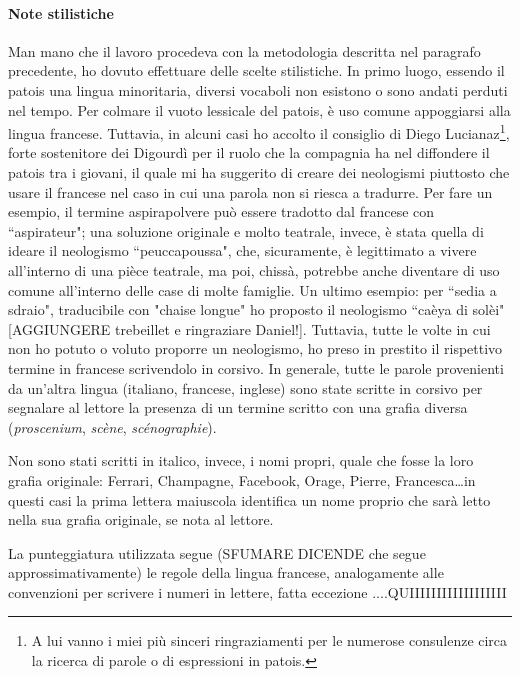 \paragraph*{Note stilistiche}
Man mano che il lavoro procedeva con la metodologia descritta nel paragrafo precedente, ho dovuto effettuare delle scelte stilistiche.
In primo luogo, essendo il patois una lingua minoritaria, diversi vocaboli non esistono o  sono andati perduti nel tempo. Per colmare il vuoto lessicale del patois, è uso comune appoggiarsi alla lingua francese. Tuttavia, in alcuni casi ho accolto il consiglio di Diego Lucianaz\footnote{ A lui vanno i miei più sinceri ringraziamenti per le numerose consulenze circa la ricerca di parole o di espressioni in patois.}, forte sostenitore dei Digourdì per il ruolo che la compagnia ha nel diffondere il patois tra i giovani, il quale mi ha suggerito di creare dei neologismi piuttosto che usare il francese nel caso in cui una parola non si riesca a tradurre. Per fare un esempio, il termine aspirapolvere può essere tradotto dal francese con ``aspirateur"; una soluzione originale e molto teatrale, invece, è stata quella di ideare il neologismo ``peuccapoussa", che, sicuramente, è legittimato a vivere all'interno di una pièce teatrale, ma poi, chissà, potrebbe anche diventare di uso comune all'interno delle case di molte famiglie. Un ultimo esempio: per ``sedia a sdraio", traducibile con "chaise longue" ho proposto il neologismo ``caèya di solèi" [AGGIUNGERE trebeillet e ringraziare Daniel!].
Tuttavia, tutte le volte in cui non ho potuto o voluto proporre un neologismo, ho preso in prestito il rispettivo termine in francese scrivendolo in corsivo. In generale, tutte le parole provenienti da un'altra lingua (italiano, francese, inglese) sono state scritte in corsivo per segnalare al lettore la presenza di un termine scritto con una grafia diversa (\textit{proscenium}, \textit{scène}, \textit{scénographie}).

Non sono stati scritti in italico, invece, i nomi propri, quale che fosse la loro grafia originale: Ferrari, Champagne, Facebook, Orage, Pierre, Francesca\ldots in questi casi la prima lettera maiuscola identifica un nome proprio che sarà letto nella sua grafia originale, se nota al lettore.

La punteggiatura utilizzata segue (SFUMARE DICENDE che segue approssimativamente) le regole della lingua francese, analogamente alle convenzioni per scrivere i numeri in lettere, fatta eccezione ....QUIIIIIIIIIIIIIIIIII %

